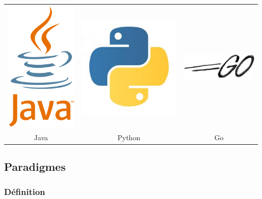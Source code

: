 \begin{tabular}{ccc}
\includegraphics[scale=0.4]{img/java} &
\includegraphics[scale=0.5]{img/python} &
\includegraphics[scale=0.8]{img/go}\\
Java & Python & Go
\end{tabular}

\subsection{Paradigmes}
\label{paradigmes}

\subsubsection{Définition}

